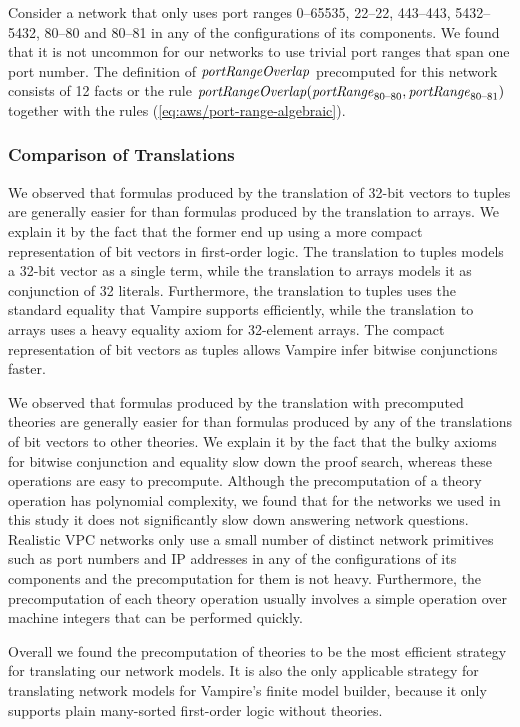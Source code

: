 Consider a network that only uses port ranges 0--65535, 22--22, 443--443, 5432--5432, 80--80 and 80--81 in any of the configurations of its components. We found that it is not uncommon for our networks to use trivial port ranges that span one port number. The definition of $\mathit{portRangeOverlap}$ precomputed for this network consists of 12 facts or the rule $\mathit{portRangeOverlap}(\mathit{portRange}_\text{80--80},\mathit{portRange}_\text{80--81})$ together with the rules (\ref{eq:aws/port-range-algebraic}).

\subsubsection*{Comparison of Translations}
We observed that formulas produced by the translation of 32-bit vectors to tuples are generally easier for \vampire than formulas produced by the translation to arrays. We explain it by the fact that the former end up using a more compact representation of bit vectors in first-order logic. The translation to tuples models a 32-bit vector as a single term, while the translation to arrays models it as conjunction of 32 literals. Furthermore, the translation to tuples uses the standard equality that Vampire supports efficiently, while the translation to arrays uses a heavy equality axiom for 32-element arrays. The compact representation of bit vectors as tuples allows Vampire infer bitwise conjunctions faster.

We observed that formulas produced by the translation with precomputed theories are generally easier for \vampire than formulas produced by any of the translations of bit vectors to other theories. We explain it by the fact that the bulky axioms for bitwise conjunction and equality slow down the proof search, whereas these operations are easy to precompute. Although the precomputation of a theory operation has polynomial complexity, we found that for the networks we used in this study it does not significantly slow down answering network questions. Realistic VPC networks only use a small number of distinct network primitives such as port numbers and IP addresses in any of the configurations of its components and the precomputation for them is not heavy. Furthermore, the precomputation of each theory operation usually involves a simple operation over machine integers that can be performed quickly.

Overall we found the precomputation of theories to be the most efficient strategy for translating our network models. It is also the only applicable strategy for translating network models for Vampire's finite model builder, because it only supports plain many-sorted first-order logic without theories. %

